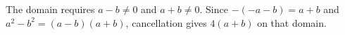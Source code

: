 The domain requires $a-b\ne0$ and $a+b\ne0$. Since $-(-a-b)=a+b$ and $a^2-b^2=(a-b)(a+b)$, cancellation gives $\boxed{4(a+b)}$ on that domain.
